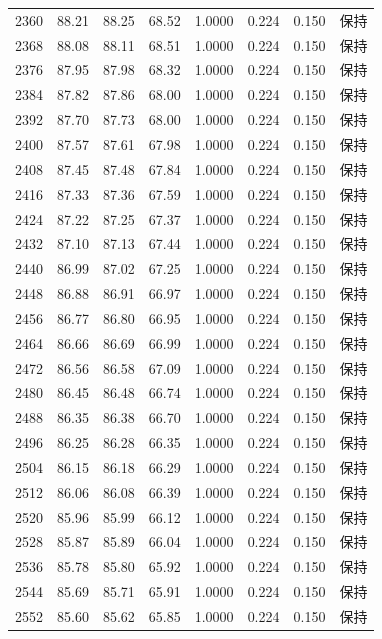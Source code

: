 \begin{longtable}{rrrrrrrr}
2360 & 88.21 & 88.25 & 68.52 & 1.0000 & 0.224 & 0.150 & 保持 \\
2368 & 88.08 & 88.11 & 68.51 & 1.0000 & 0.224 & 0.150 & 保持 \\
2376 & 87.95 & 87.98 & 68.32 & 1.0000 & 0.224 & 0.150 & 保持 \\
2384 & 87.82 & 87.86 & 68.00 & 1.0000 & 0.224 & 0.150 & 保持 \\
2392 & 87.70 & 87.73 & 68.00 & 1.0000 & 0.224 & 0.150 & 保持 \\
2400 & 87.57 & 87.61 & 67.98 & 1.0000 & 0.224 & 0.150 & 保持 \\
2408 & 87.45 & 87.48 & 67.84 & 1.0000 & 0.224 & 0.150 & 保持 \\
2416 & 87.33 & 87.36 & 67.59 & 1.0000 & 0.224 & 0.150 & 保持 \\
2424 & 87.22 & 87.25 & 67.37 & 1.0000 & 0.224 & 0.150 & 保持 \\
2432 & 87.10 & 87.13 & 67.44 & 1.0000 & 0.224 & 0.150 & 保持 \\
2440 & 86.99 & 87.02 & 67.25 & 1.0000 & 0.224 & 0.150 & 保持 \\
2448 & 86.88 & 86.91 & 66.97 & 1.0000 & 0.224 & 0.150 & 保持 \\
2456 & 86.77 & 86.80 & 66.95 & 1.0000 & 0.224 & 0.150 & 保持 \\
2464 & 86.66 & 86.69 & 66.99 & 1.0000 & 0.224 & 0.150 & 保持 \\
2472 & 86.56 & 86.58 & 67.09 & 1.0000 & 0.224 & 0.150 & 保持 \\
2480 & 86.45 & 86.48 & 66.74 & 1.0000 & 0.224 & 0.150 & 保持 \\
2488 & 86.35 & 86.38 & 66.70 & 1.0000 & 0.224 & 0.150 & 保持 \\
2496 & 86.25 & 86.28 & 66.35 & 1.0000 & 0.224 & 0.150 & 保持 \\
2504 & 86.15 & 86.18 & 66.29 & 1.0000 & 0.224 & 0.150 & 保持 \\
2512 & 86.06 & 86.08 & 66.39 & 1.0000 & 0.224 & 0.150 & 保持 \\
2520 & 85.96 & 85.99 & 66.12 & 1.0000 & 0.224 & 0.150 & 保持 \\
2528 & 85.87 & 85.89 & 66.04 & 1.0000 & 0.224 & 0.150 & 保持 \\
2536 & 85.78 & 85.80 & 65.92 & 1.0000 & 0.224 & 0.150 & 保持 \\
2544 & 85.69 & 85.71 & 65.91 & 1.0000 & 0.224 & 0.150 & 保持 \\
2552 & 85.60 & 85.62 & 65.85 & 1.0000 & 0.224 & 0.150 & 保持 \\

\end{longtable}
